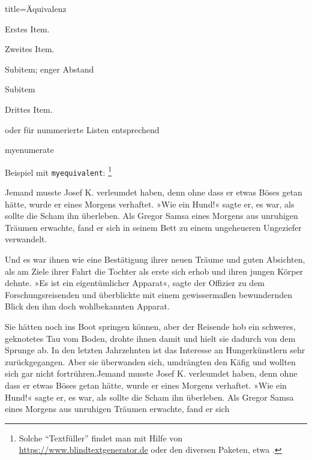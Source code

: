 %
\begin{dispExample*}{title=Äquivalenz}
\begin{myequivalent}
	\item
	Erstes Item. 
	\item
	Zweites Item.
  \begin{myequivalent}[nosep]
		\item
		Subitem; enger Abstand
		\item
		Subitem 
  \end{myequivalent}
	\item
	Drittes Item.
\end{myequivalent}
\end{dispExample*}
%
oder für nummerierte Listen entsprechend
%
\begin{docEnvironment}
	{myenumerate}{}
\end{docEnvironment}
%
Beispiel mit \texttt{myequivalent}:%
\footnote{Solche \enquote{Textfüller} findet man mit Hilfe von \href{https://www.blindtextgenerator.de}{https://www.blindtextgenerator.de} oder den diversen Paketen, etwa .}
%
\begin{myequivalent}
	\item
	Jemand musste Josef K. verleumdet haben, denn ohne dass er etwas Böses getan hätte, wurde er eines Morgens verhaftet. »Wie ein Hund!« sagte er, es war, als sollte die Scham ihn überleben. Als Gregor Samsa eines Morgens aus unruhigen Träumen erwachte, fand er sich in seinem Bett zu einem ungeheueren Ungeziefer verwandelt. 
	
	\item
	Und es war ihnen wie eine Bestätigung ihrer neuen Träume und guten Absichten, als am Ziele ihrer Fahrt die Tochter als erste sich erhob und ihren jungen Körper dehnte. »Es ist ein eigentümlicher Apparat«, sagte der Offizier zu dem Forschungsreisenden und überblickte mit einem gewissermaßen bewundernden Blick den ihm doch wohlbekannten Apparat. 
	
	\item
	Sie hätten noch ins Boot springen können, aber der Reisende hob ein schweres, geknotetes Tau vom Boden, drohte ihnen damit und hielt sie dadurch von dem Sprunge ab. In den letzten Jahrzehnten ist das Interesse an Hungerkünstlern sehr zurückgegangen. Aber sie überwanden sich, umdrängten den Käfig und wollten sich gar nicht fortrühren.Jemand musste Josef K. verleumdet haben, denn ohne dass er etwas Böses getan hätte, wurde er eines Morgens verhaftet. »Wie ein Hund!« sagte er, es war, als sollte die Scham ihn überleben. Als Gregor Samsa eines Morgens aus unruhigen Träumen erwachte, fand er sich
\end{myequivalent}
